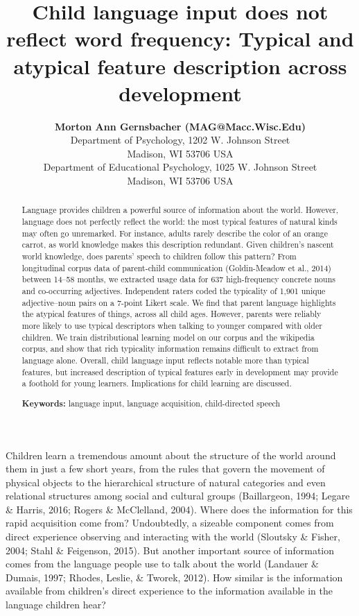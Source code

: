 \documentclass[10pt, letterpaper]{article}
\title{Child language input does not reflect word frequency: Typical and
atypical feature description across development}
\author{{\large \bf Morton Ann Gernsbacher (MAG@Macc.Wisc.Edu)} \\ Department of Psychology, 1202 W. Johnson Street \\ Madison, WI 53706 USA \AND {\large \bf Sharon J.~Derry (SDJ@Macc.Wisc.Edu)} \\ Department of Educational Psychology, 1025 W. Johnson Street \\ Madison, WI 53706 USA}
\begin{document}
\maketitle

\begin{abstract}
Language provides children a powerful source of information about the
world. However, language does not perfectly reflect the world: the most
typical features of natural kinds may often go unremarked. For instance,
adults rarely describe the color of an orange carrot, as world knowledge
makes this description redundant. Given children's nascent world
knowledge, does parents' speech to children follow this pattern? From
longitudinal corpus data of parent-child communication (Goldin-Meadow et
al., 2014) between 14--58 months, we extracted usage data for 637
high-frequency concrete nouns and co-occurring adjectives. Independent
raters coded the typicality of 1,901 unique adjective--noun pairs on a
7-point Likert scale. We find that parent language highlights the
atypical features of things, across all child ages. However, parents
were reliably more likely to use typical descriptors when talking to
younger compared with older children. We train distributional learning
model on our corpus and the wikipedia corpus, and show that rich
typicality information remains difficult to extract from language alone.
Overall, child language input reflects notable more than typical
features, but increased description of typical features early in
development may provide a foothold for young learners. Implications for
child learning are discussed.

\textbf{Keywords:}
language input, language acquisition, child-directed speech
\end{abstract}

Children learn a tremendous amount about the structure of the world
around them in just a few short years, from the rules that govern the
movement of physical objects to the hierarchical structure of natural
categories and even relational structures among social and cultural
groups (Baillargeon, 1994; Legare \& Harris, 2016; Rogers \& McClelland,
2004). Where does the information for this rapid acquisition come from?
Undoubtedly, a sizeable component comes from direct experience observing
and interacting with the world (Sloutsky \& Fisher, 2004; Stahl \&
Feigenson, 2015). But another important source of information comes from
the language people use to talk about the world (Landauer \& Dumais,
1997; Rhodes, Leslie, \& Tworek, 2012). How similar is the information
available from children's direct experience to the information available
in the language children hear?
\end{document}
